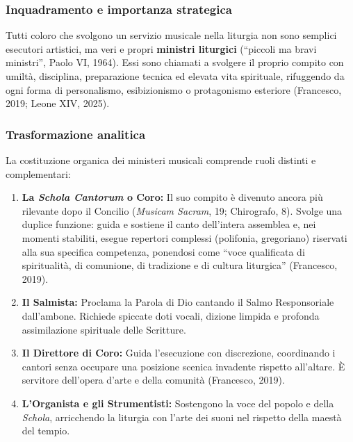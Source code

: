\documentclass[12pt,a4paper]{article}
\begin{document}
	\subsubsection{Inquadramento e importanza strategica}\label{inquadramento-e-importanza-strategica-7}
	
	Tutti coloro che svolgono un servizio musicale nella liturgia non sono semplici esecutori artistici, ma veri e propri \textbf{ministri liturgici} (``piccoli ma bravi ministri'', Paolo VI, 1964). Essi sono chiamati a svolgere il proprio compito con umiltà, disciplina, preparazione tecnica ed elevata vita spirituale, rifuggendo da ogni forma di personalismo, esibizionismo o protagonismo esteriore (Francesco, 2019; Leone XIV, 2025).
	
	\subsubsection{Trasformazione analitica}\label{trasformazione-analitica-7}
	
	La costituzione organica dei ministeri musicali comprende ruoli distinti e complementari:
	
	\begin{enumerate}[label=\arabic*.,leftmargin=*]
		\item \textbf{La \emph{Schola Cantorum} o Coro:} Il suo compito è divenuto ancora più rilevante dopo il Concilio (\emph{Musicam Sacram}, 19; Chirografo, 8). Svolge una duplice funzione: guida e sostiene il canto dell'intera assemblea e, nei momenti stabiliti, esegue repertori complessi (polifonia, gregoriano) riservati alla sua specifica competenza, ponendosi come ``voce qualificata di spiritualità, di comunione, di tradizione e di cultura liturgica'' (Francesco, 2019).
		\item \textbf{Il Salmista:} Proclama la Parola di Dio cantando il Salmo Responsoriale dall'ambone. Richiede spiccate doti vocali, dizione limpida e profonda assimilazione spirituale delle Scritture.
		\item \textbf{Il Direttore di Coro:} Guida l'esecuzione con discrezione, coordinando i cantori senza occupare una posizione scenica invadente rispetto all'altare. È servitore dell'opera d'arte e della comunità (Francesco, 2019).
		\item \textbf{L'Organista e gli Strumentisti:} Sostengono la voce del popolo e della \emph{Schola}, arricchendo la liturgia con l'arte dei suoni nel rispetto della maestà del tempio.
	\end{enumerate}
	
\end{document}
